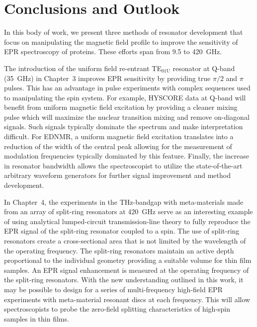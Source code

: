 \chapter[Conclusions and Outlook]{Conclusions and Outlook}

In this body of work, we present three methods of resonator development that focus on manipulating the magnetic field profile to improve the sensitivity of EPR spectroscopy of proteins. These efforts span from 9.5 to 420~GHz.  

The introduction of the uniform field re-entrant TE$_{\text{01U}}$ resonator at Q-band (35~GHz) in Chapter~3 improves EPR sensitivity by providing true $\pi/2$ and $\pi$ pulses. This has an advantage in pulse experiments with complex sequences used to manipulating the spin system. For example, HYSCORE data at Q-band will benefit from uniform magnetic field excitation by providing a cleaner mixing pulse which will maximize the nuclear transition mixing and remove on-diagonal signals. \cite{Doorslaer2007,Harmer2009} Such signals typically dominate the spectrum and make interpretation difficult. For EDNMR, a uniform magnetic field excitation translates into a reduction of the width of the central peak allowing for the measurement of modulation frequencies typically dominated by this feature. \cite{NicholasCox2013} Finally, the increase in resonator bandwidth allows the spectroscopist to utilize the state-of-the-art arbitrary waveform generators for further signal improvement and method development. \cite{DOLL201327,dSegawa2015,SPINDLER201730,WILI201826,PRISNER201998}

In Chapter~4, the experiments in the THz-bandgap with meta-materials made from an array of split-ring resonators at 420~GHz serve as an interesting example of using analytical lumped-circuit transmission-line theory to fully reproduce the EPR signal of the split-ring resonator coupled to a spin. The use of split-ring resonators create a cross-sectional area that is not limited by the wavelength of the operating frequency. The split-ring resonators maintain an active depth proportional to the individual geometry providing a suitable volume for thin film samples. An EPR signal enhancement is measured at the operating frequency of the split-ring resonators. With the new understanding outlined in this work, it may be possible to design for a series of multi-frequency high-field EPR experiments with meta-material resonant discs at each frequency. This will allow spectroscopists to probe the zero-field splitting characteristics of high-spin samples in thin films.

